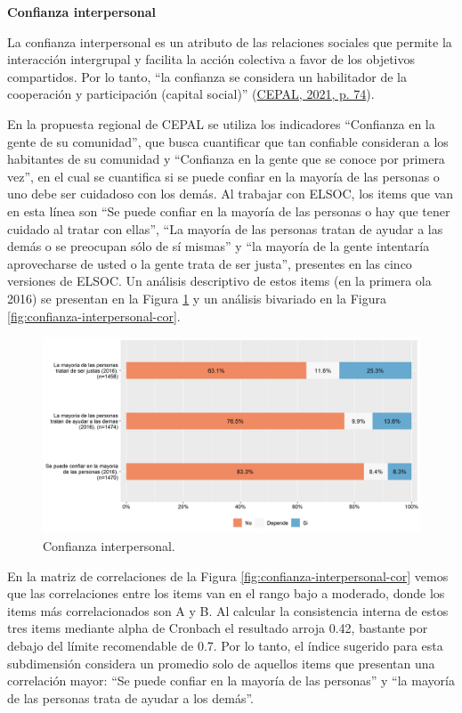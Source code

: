 \documentclass[
  12pt,
]{book}
\begin{document}
\textbf{Confianza interpersonal}

La confianza interpersonal es un atributo de las relaciones sociales que permite la interacción intergrupal y facilita la acción colectiva a favor de los objetivos compartidos. Por lo tanto, ``la confianza se considera un habilitador de la cooperación y participación (capital social)'' (\protect\hyperlink{ref-cepal_cohesion_2021}{CEPAL, 2021, p. 74}).

En la propuesta regional de CEPAL se utiliza los indicadores ``Confianza en la gente de su comunidad'', que busca cuantificar que tan confiable consideran a los habitantes de su comunidad y ``Confianza en la gente que se conoce por primera vez'', en el cual se cuantifica si se puede confiar en la mayoría de las personas o uno debe ser cuidadoso con los demás. Al trabajar con ELSOC, los items que van en esta línea son ``Se puede confiar en la mayoría de las personas o hay que tener cuidado al tratar con ellas'', ``La mayoría de las personas tratan de ayudar a las demás o se preocupan sólo de sí mismas'' y ``la mayoría de la gente intentaría aprovecharse de usted o la gente trata de ser justa'', presentes en las cinco versiones de ELSOC. Un análisis descriptivo de estos items (en la primera ola 2016) se presentan en la Figura \ref{fig:confianza-interpersonal} y un análisis bivariado en la Figura \ref{fig:confianza-interpersonal-cor}.

\begin{figure}[H]

{\centering \includegraphics[width=1\linewidth,height=1\textheight]{output/graphs/confianza-interpersonal} 

}

\caption{Confianza interpersonal.}\label{fig:confianza-interpersonal}
\end{figure}

En la matriz de correlaciones de la Figura \ref{fig:confianza-interpersonal-cor} vemos que las correlaciones entre los items van en el rango bajo a moderado, donde los items más correlacionados son A y B. Al calcular la consistencia interna de estos tres items mediante alpha de Cronbach el resultado arroja 0.42, bastante por debajo del límite recomendable de 0.7. Por lo tanto, el índice sugerido para esta subdimensión considera un promedio solo de aquellos items que presentan una correlación mayor: ``Se puede confiar en la mayoría de las personas'' y ``la mayoría de las personas trata de ayudar a los demás''.
\end{document}
